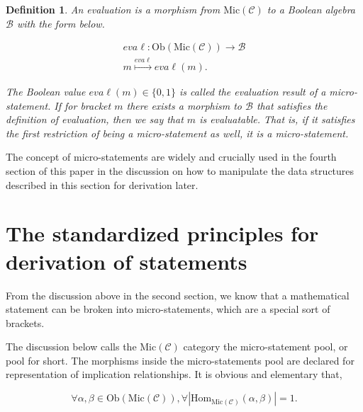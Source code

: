 \documentclass{aims}
\numberwithin{equation}{section}
\newtheorem{definition}{Definition}	%
\numberwithin{theorem}{section}	%
\numberwithin{axiom}{section}	%
\numberwithin{definition}{section}	%
\begin{document}
	\begin{definition}
		An evaluation is a morphism from \(\text{Mic}(\mathcal{C})\) to a Boolean algebra \(\mathcal{B}\) with the form below.
		
		\begin{equation}
			\begin{gathered}
				\mathit{e}\mathit{v}\mathit{a}\ell :\text{Ob}(\text{Mic}(\mathcal{C}))\to \mathcal{B}\\
				\mathit{m}\overset{\mathit{e}\mathit{v}\mathit{a}\ell }{\mapsto }\mathit{e}\mathit{v}\mathit{a}\ell (\mathit{m}).
			\end{gathered}
		\end{equation}
		
		The Boolean value \(\mathit{e}\mathit{v}\mathit{a}\ell (\mathit{m})\in \{0,1\}\) is called the{ evaluation result} of a micro-statement. If for bracket \(\mathit{m}\) there exists a morphism to \(\mathcal{B}\) that satisfies the definition of evaluation, then we say that \(\mathit{m}\) is{ evaluatable}. That is, if it satisfies the first restriction of being a micro-statement as well, it is a micro-statement.
	\end{definition}
	
	The concept of micro-statements are widely and crucially used in the fourth section of this paper in the discussion on how to manipulate the data structures described in this section for derivation later.
	
	\section{The standardized principles for derivation of statements}
	
	From the discussion above in the second section, we know that a mathematical statement can be broken into micro-statements, which are a special sort of brackets.
	
	The discussion below calls the \(\text{Mic}(\mathcal{C})\) category the{ micro-statement pool}, or{ pool} for short. The morphisms inside the micro-statements pool are declared for representation of implication relationships. It is obvious and elementary that,
	
	\begin{equation}
		\forall \alpha ,\beta \in \text{Ob}(\text{Mic}(\mathcal{C})), \forall \left|\text{Hom}_{\text{Mic}(\mathcal{C})}(\alpha ,\beta )\right|=1.
	\end{equation}
	
\end{document}
